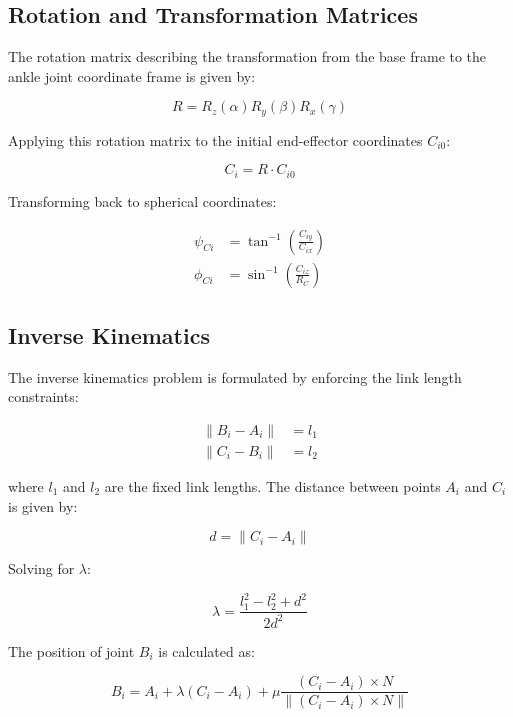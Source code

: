 \documentclass[letterpaper, 10 pt, conference]{ieeeconf}  %
\begin{document}
\subsection{Rotation and Transformation Matrices}
The rotation matrix describing the transformation from the base frame to the ankle joint coordinate frame is given by:

\begin{equation}
R = R_z(\alpha) R_y(\beta) R_x(\gamma)
\end{equation}

Applying this rotation matrix to the initial end-effector coordinates $C_{i0}$:

\begin{equation}
C_i = R \cdot C_{i0}
\end{equation}

Transforming back to spherical coordinates:

\begin{align}
\psi_{Ci} &= \tan^{-1} \left( \frac{C_{iy}}{C_{ix}} \right) \\
\phi_{Ci} &= \sin^{-1} \left( \frac{C_{iz}}{R_C} \right)
\end{align}

\subsection{Inverse Kinematics}
The inverse kinematics problem is formulated by enforcing the link length constraints:

\begin{align}
\| B_i - A_i \| &= l_1 \\
\| C_i - B_i \| &= l_2
\end{align}

where $l_1$ and $l_2$ are the fixed link lengths. The distance between points $A_i$ and $C_i$ is given by:

\begin{equation}
d = \| C_i - A_i \|
\end{equation}

Solving for $\lambda$:

\begin{equation}
\lambda = \frac{l_1^2 - l_2^2 + d^2}{2d^2}
\end{equation}

The position of joint $B_i$ is calculated as:

\begin{equation}
B_i = A_i + \lambda (C_i - A_i) + \mu \frac{(C_i - A_i) \times N}{\|(C_i - A_i) \times N\|}
\end{equation}
\end{document}

